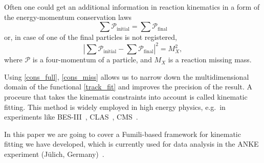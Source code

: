 Often one could get an additional information in reaction kinematics in a form of the energy-momentum conservation laws
\begin{equation}
\label{cons_full}
\sum\mathcal{P}_\mathrm{initial} = \sum\mathcal{P}_\mathrm{final}
\end{equation}
or, in case of one of the final particles is not registered,
\begin{equation}
\label{cons_miss}
\displaystyle\left|\sum\mathcal{P}_\mathrm{initial} - \sum\mathcal{P}_\mathrm{final}\right|^2 = M_X^2,
\end{equation}
where $\mathcal{P}$ is a four-momentum of a particle, and $M_X$ is a reaction missing mass.

Using \eqref{cons_full}, \eqref{cons_miss} allows us to narrow down the multidimensional domain of the functional \eqref{track_fit} 
and improves the precision of the result.
A proceure that takes the kinematis constraints into account is called kinematic fitting.
This method is widely employed in high energy physics, e.g.\ in experiments like 
BES-III~\cite{BESIII}, %
CLAS~\cite{CLAS}, %
CMS~\cite{CMS}. %

In this paper we are going to cover a Fumili-based framework for kinematic fitting we have developed, which is currently used for data analysis in the ANKE experiment (Jülich, Germany)~\cite{anke}.
